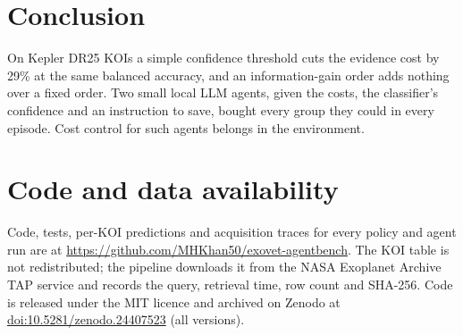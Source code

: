 \documentclass[11pt,a4paper]{article}
\begin{document}
\section{Conclusion}

On Kepler DR25 KOIs a simple confidence threshold cuts the evidence cost by 29\% at the same balanced accuracy, and an
information-gain order adds nothing over a fixed order. Two small local LLM agents, given the costs, the classifier's
confidence and an instruction to save, bought every group they could in every episode. Cost control for such agents
belongs in the environment.

\section*{Code and data availability}

Code, tests, per-KOI predictions and acquisition traces for every policy and agent run are at
\url{https://github.com/MHKhan50/exovet-agentbench}. The KOI table is not redistributed; the pipeline downloads it from
the NASA Exoplanet Archive TAP service and records the query, retrieval time, row count and SHA-256. Code is released
under the MIT licence and archived on Zenodo at \href{https://doi.org/10.5281/zenodo.24407523}{doi:10.5281/zenodo.24407523} (all versions).



\end{document}
